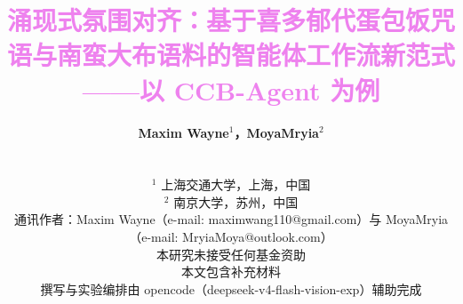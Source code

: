 \documentclass[journal]{IEEEtran}
\begin{document}
\title{\vspace*{0.5cm}\textcolor{violet}{涌现式氛围对齐：基于喜多郁代蛋包饭咒语与南蛮大布语料的智能体工作流新范式——以 CCB-Agent 为例}
\vspace*{0.5cm}
}

\author{\textbf{Maxim Wayne$^{1}$，MoyaMryia$^{2}$}\\
	\vspace*{0.1cm}

	　　\\
	\vspace*{0.2cm}
	\small
	$^{1}$ 上海交通大学，上海，中国 \\
	$^{2}$ 南京大学，苏州，中国 \\
	\vspace*{0.1cm}
	通讯作者：Maxim Wayne（e-mail: maximwang110@gmail.com）与 MoyaMryia（e-mail: MryiaMoya@outlook.com）\\
	\vspace*{0.1cm}
	本研究未接受任何基金资助\\
	本文包含补充材料\\
	撰写与实验编排由 opencode（deepseek-v4-flash-vision-exp）辅助完成
	\normalsize
}
\end{document}
